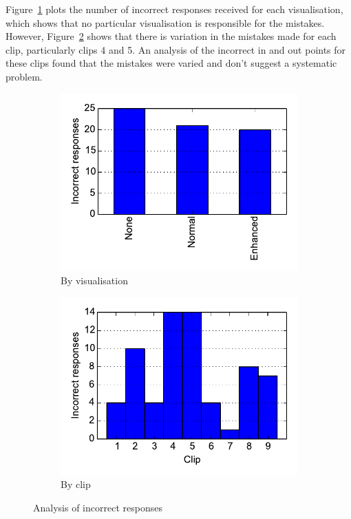 Figure~\ref{fig:rejectvis} plots the number of incorrect responses received for each visualisation, which shows that no
particular visualisation is responsible for the mistakes. However, Figure~\ref{fig:rejectclip} shows that there is
variation in the mistakes made for each clip, particularly clips 4 and 5. An analysis of the incorrect in and out
points for these clips found that the mistakes were varied and don't suggest a systematic problem. 

\begin{figure}[ht]
\centering
\begin{subfigure}{.5\textwidth}
  \centering
  \includegraphics[width=\linewidth]{figs/rejects-vis.pdf}
  \caption{By visualisation}
  \label{fig:rejectvis}
\end{subfigure}%
\begin{subfigure}{.5\textwidth}
  \centering
  \includegraphics[width=\linewidth]{figs/rejects-clip.pdf}
  \caption{By clip}
  \label{fig:rejectclip}
\end{subfigure}
\caption{Analysis of incorrect responses}
\label{fig:rejects}
\end{figure}

